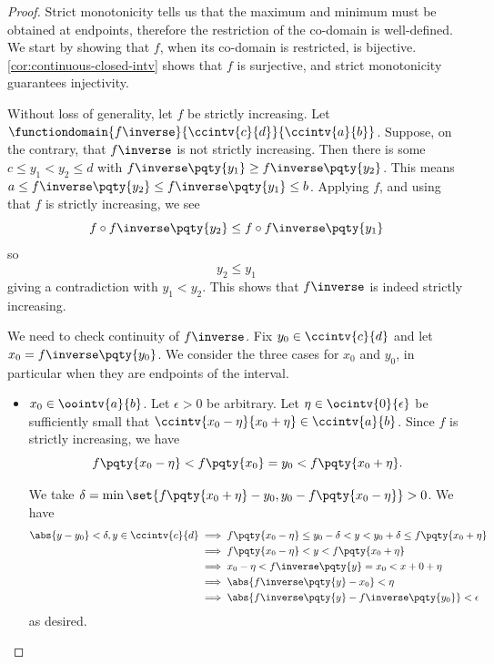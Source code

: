 \begin{proof}
    Strict monotonicity tells us that the maximum and minimum must be obtained at endpoints, therefore the restriction of the co-domain is well-defined. We start by showing that \(f\), when its co-domain is restricted, is bijective. \autoref{cor:continuous-closed-intv} shows that \(f\) is surjective, and strict monotonicity guarantees injectivity.

    Without loss of generality, let \(f\) be strictly increasing. Let \(\functiondomain{f\inverse}{\ccintv{c}{d}}{\ccintv{a}{b}}\). Suppose, on the contrary, that \(f\inverse\) is not strictly increasing. Then there is some \(c \leq y_1 < y_2 \leq d\) with \(f\inverse\pqty{y_1} \geq f\inverse\pqty{y_2}\). This means \(a \leq f\inverse\pqty{y_2} \leq f\inverse\pqty{y_1} \leq b\). Applying \(f\), and using that \(f\) is strictly increasing, we see
    \[
        f \circ f\inverse\pqty{y_2} \leq f \circ f\inverse\pqty{y_1}
    \]
    so
    \[
        y_2 \leq y_1
    \]
    giving a contradiction with \(y_1 < y_2\). This shows that \(f\inverse\) is indeed strictly increasing.

    We need to check continuity of \(f\inverse\). Fix \(y_0 \in \ccintv{c}{d}\) and let \(x_0 = f\inverse\pqty{y_0}\). We consider the three cases for \(x_0\) and \(y_0\), in particular when they are endpoints of the interval.

    \begin{itemize}
        \item \(x_0 \in \oointv{a}{b}\). Let \(\epsilon > 0\) be arbitrary. Let \(\eta \in \ocintv{0}{\epsilon}\) be sufficiently small that \(\ccintv{x_0 - \eta}{x_0 + \eta} \in \ccintv{a}{b}\). Since \(f\) is strictly increasing, we have
        \[
            f\pqty{x_0 - \eta} < f\pqty{x_0} = y_0 < f\pqty{x_0 + \eta}.
        \]

        We take \(\delta = \min\set{f\pqty{x_0 + \eta} - y_0, y_0 - f\pqty{x_0 - \eta}} > 0\). We have
        \begin{align*}
            \abs{y - y_0} < \delta, y \in \ccintv{c}{d} &\implies f\pqty{x_0 - \eta} \leq y_0 - \delta < y < y_0 + \delta \leq f\pqty{x_0 + \eta} \\
            &\implies f\pqty{x_0 - \eta} < y < f\pqty{x_0 + \eta} \\
            &\implies x_0 - \eta < f\inverse\pqty{y} = x_0 < x+0 + \eta \\
            &\implies \abs{f\inverse\pqty{y} - x_0} < \eta \\
            &\implies \abs{f\inverse\pqty{y} - f\inverse\pqty{y_0}} < \epsilon
        \end{align*}
        as desired.


\end{itemize}
\end{proof}
